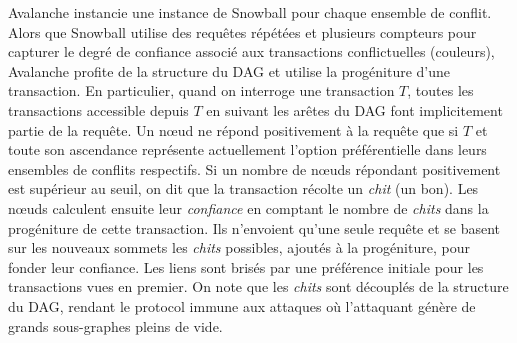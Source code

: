 %    

Avalanche instancie une instance de Snowball pour chaque ensemble de conflit.
Alors que Snowball utilise des requêtes répétées et plusieurs compteurs pour capturer le degré de confiance associé aux transactions conflictuelles (couleurs),
Avalanche profite de la structure du DAG et utilise la progéniture d'une transaction.
En particulier, quand on interroge une transaction $T$, toutes les transactions accessible depuis $T$ en suivant les arêtes du DAG font implicitement partie de la requête.
Un nœud ne répond positivement à la requête que si $T$ et toute son ascendance représente actuellement l'option préférentielle dans leurs ensembles de conflits respectifs.
Si un nombre de nœuds répondant positivement est supérieur au seuil, on dit que la transaction récolte un \emph{chit} (un bon).
Les nœuds calculent ensuite leur \emph{confiance} en comptant le nombre de \emph{chits} dans la progéniture de cette transaction.
Ils n'envoient qu'une seule requête et se basent sur les nouveaux sommets les \emph{chits} possibles, ajoutés à la progéniture, pour fonder leur confiance.
Les liens sont brisés par une préférence initiale pour les transactions vues en premier.
On note que les \emph{chits} sont découplés de la structure du DAG, rendant le protocol immune aux attaques où l'attaquant génère de grands sous-graphes pleins de vide.

